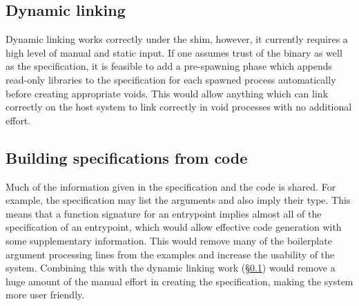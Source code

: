 \documentclass[12pt,a4paper,twoside]{report}
\begin{document}
\subsection{Dynamic linking}
\label{sec:future-work-dynamic-linking}

Dynamic linking works correctly under the shim, however, it currently requires a high level of manual and static input. If one assumes trust of the binary as well as the specification, it is feasible to add a pre-spawning phase which appends read-only libraries to the specification for each spawned process automatically before creating appropriate voids. This would allow anything which can link correctly on the host system to link correctly in void processes with no additional effort.

\subsection{Building specifications from code}
\label{sec:future-work-macros}

Much of the information given in the specification and the code is shared. For example, the specification may list the arguments and also imply their type. This means that a function signature for an entrypoint implies almost all of the specification of an entrypoint, which would allow effective code generation with some supplementary information. This would remove many of the boilerplate argument processing lines from the examples and increase the usability of the system. Combining this with the dynamic linking work (§\ref{sec:future-work-dynamic-linking}) would remove a huge amount of the manual effort in creating the specification, making the system more user friendly.

\label{lastcontentpage} %

 


\appendix

\label{lastpage}
\end{document}
